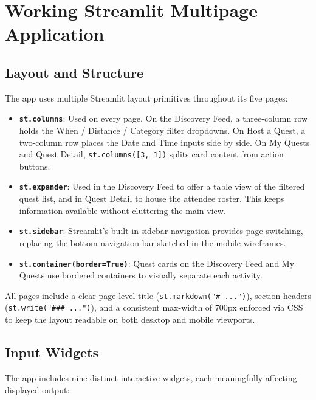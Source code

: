 \documentclass[11pt]{article}
\begin{document}
\section{Working Streamlit Multipage Application}

\subsection{Layout and Structure}

The app uses multiple Streamlit layout primitives throughout its five pages:

\begin{itemize}
    \item \textbf{\texttt{st.columns}}: Used on every page. On the Discovery Feed, a three-column row holds the When / Distance / Category filter dropdowns. On Host a Quest, a two-column row places the Date and Time inputs side by side. On My Quests and Quest Detail, \texttt{st.columns([3, 1])} splits card content from action buttons.
    \item \textbf{\texttt{st.expander}}: Used in the Discovery Feed to offer a table view of the filtered quest list, and in Quest Detail to house the attendee roster. This keeps information available without cluttering the main view.
    \item \textbf{\texttt{st.sidebar}}: Streamlit's built-in sidebar navigation provides page switching, replacing the bottom navigation bar sketched in the mobile wireframes.
    \item \textbf{\texttt{st.container(border=True)}}: Quest cards on the Discovery Feed and My Quests use bordered containers to visually separate each activity.
\end{itemize}

All pages include a clear page-level title (\texttt{st.markdown("\# ...")}), section headers (\texttt{st.write("### ...")}), and a consistent max-width of 700px enforced via CSS to keep the layout readable on both desktop and mobile viewports.

\subsection{Input Widgets}

The app includes nine distinct interactive widgets, each meaningfully affecting displayed output:
\end{document}
